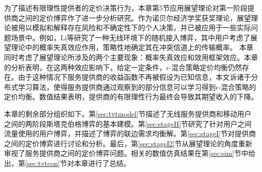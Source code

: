 为了描述有限理性提供者的定价决策行为，本章第5节应用{\kaishu 展望理论}\cite{Kahneman}对第一阶段提供商之间的定价博弈作了进一步分析研究。作为诺贝尔经济学奖获奖理论，展望理论被用以模拟和解释存在风险和不确定性下的个人决策\cite{Tianming,Yu}，并已被应用于一些实际问题场景中。例如，Li等\cite{Tianming}研究了一种无线环境下的随机接入博弈，其中用户考虑了展望理论中的{\kaishu 概率失真效应}作用，策略性地确定其在冲突信道上的传输概率。
本章同时考虑了展望理论所涉及的两个主要现象：{\kaishu 概率失真效应}和{\kaishu 效用框架效应}。本章的分析表明，在这两种效应影响下​​，给定一定条件，$\epsilon$-混合策略定价均衡仍然存在。由于这种情况下服务提供商的收益函数不再被假设为已知信息，本文诉诸于分布式学习算法，使得服务提供商通过观察到的部分信息可以学习得到$\epsilon$-混合策略的定价均衡。数值结果表明，提供商的有限理性行为最终会导致其期望收入的下降。

本章的剩余部分组织如下。第\ref{sec:tvtmodel}节描述了无线服务提供商和移动用户之间的两阶段斯塔克伯格博弈的基本建模。第\ref{sec:stageII}节研究了针对用户之间流量使用的用户博弈，并描述了博弈的联边需求均衡解。第\ref{sec:stageI}节对提供商之间的定价博弈进行讨论和分析。最后，第\ref{sec:stageI2}节从展望理论的角度重新审视了服务提供商之间的定价博弈问题。相关的数值仿真结果在第\ref{sec:sim}节中给出，第\ref{sec:tvtcon}节对本章进行了总结。

